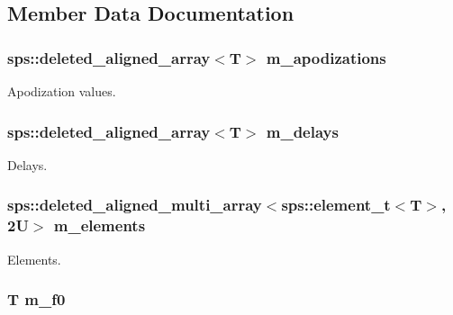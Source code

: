 \subsection{Member Data Documentation}
\hypertarget{singletonfnm_1_1ApertureData_af488bbf393fcd49e6698dcf3ce028041}{
\subsubsection[{m\+\_\+apodizations}]{\setlength{\rightskip}{0pt plus 5cm}sps\+::deleted\+\_\+aligned\+\_\+array$<$T$>$ m\+\_\+apodizations}}\label{singletonfnm_1_1ApertureData_af488bbf393fcd49e6698dcf3ce028041}


Apodization values. 

\hypertarget{singletonfnm_1_1ApertureData_ac769b07e6f634757ef28e556a1a47dc2}{
\subsubsection[{m\+\_\+delays}]{\setlength{\rightskip}{0pt plus 5cm}sps\+::deleted\+\_\+aligned\+\_\+array$<$T$>$ m\+\_\+delays}}\label{singletonfnm_1_1ApertureData_ac769b07e6f634757ef28e556a1a47dc2}


Delays. 

\hypertarget{singletonfnm_1_1ApertureData_a53616cedfa7ae60a83e12ab990d2cd66}{
\subsubsection[{m\+\_\+elements}]{\setlength{\rightskip}{0pt plus 5cm}sps\+::deleted\+\_\+aligned\+\_\+multi\+\_\+array$<$sps\+::element\+\_\+t$<$T$>$, 2\+U$>$ m\+\_\+elements}}\label{singletonfnm_1_1ApertureData_a53616cedfa7ae60a83e12ab990d2cd66}


Elements. 

\hypertarget{singletonfnm_1_1ApertureData_a628c4a5cd9324cca318c700cf441b9c8}{
\subsubsection[{m\+\_\+f0}]{\setlength{\rightskip}{0pt plus 5cm}T m\+\_\+f0}}\label{singletonfnm_1_1ApertureData_a628c4a5cd9324cca318c700cf441b9c8}


